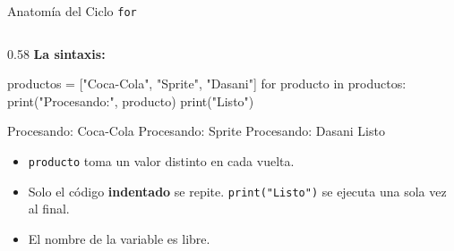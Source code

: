 \documentclass[aspectratio=169, 11pt]{beamer}
\begin{document}
\begin{frame}[fragile,shrink=25]{Anatomía del Ciclo \texttt{for}}
\begin{columns}[T]
    \begin{column}{0.58\textwidth}
      {\footnotesize\color{arcaDark}\bfseries La sintaxis:}
      \vspace{2pt}
      \begin{center}
      \end{center}

      \vspace{4pt}
      \begin{pyblock}
productos = ["Coca-Cola", "Sprite", "Dasani"]
for producto in productos:
    print("Procesando:", producto)
print("Listo")
      \end{pyblock}
      \vspace{-2pt}
      \begin{outputblock}
Procesando: Coca-Cola
Procesando: Sprite
Procesando: Dasani
Listo
      \end{outputblock}

      \vspace{2pt}
      {\scriptsize\color{textMuted}
      \begin{itemize}\setlength{\itemsep}{2pt}
        \item[{\color{arcaRed}\scriptsize\faArrowRight}]
          \texttt{producto} toma un valor distinto en cada vuelta.
        \item[{\color{arcaRed}\scriptsize\faArrowRight}]
          Solo el código \textbf{indentado} se repite.
          \texttt{print("Listo")} se ejecuta una sola vez al final.
        \item[{\color{arcaRed}\scriptsize\faArrowRight}]
          El nombre de la variable es libre.
      \end{itemize}
      }
    \end{column}
  \end{columns}
\end{frame}
\end{document}

